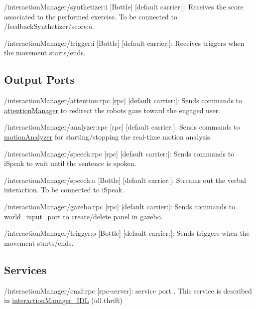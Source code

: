 \begin{DoxyItemize}
\item /interaction\+Manager/synthetizer\+:i \mbox{[}Bottle\mbox{]} \mbox{[}default carrier\+:\mbox{]}\+: Receives the score associated to the performed exercise. To be connected to /feedback\+Synthetizer/score\+:o.
\item /interaction\+Manager/trigger\+:i \mbox{[}Bottle\mbox{]} \mbox{[}default carrier\+:\mbox{]}\+: Receives triggers when the movement starts/ends.
\end{DoxyItemize}\hypertarget{group__skeletonViewer_outputports_sec}{}\subsection{Output Ports}\label{group__skeletonViewer_outputports_sec}

\begin{DoxyItemize}
\item /interaction\+Manager/attention\+:rpc \mbox{[}rpc\mbox{]} \mbox{[}default carrier\+:\mbox{]}\+: Sends commands to \mbox{\hyperlink{group__attentionManager}{attention\+Manager}} to redirect the robot\textquotesingle{}s gaze toward the engaged user.
\item /interaction\+Manager/analyzer\+:rpc \mbox{[}rpc\mbox{]} \mbox{[}default carrier\+:\mbox{]}\+: Sends commands to \mbox{\hyperlink{group__motionAnalyzer}{motion\+Analyzer}} for starting/stopping the real-\/time motion analysis.
\item /interaction\+Manager/speech\+:rpc \mbox{[}rpc\mbox{]} \mbox{[}default carrier\+:\mbox{]}\+: Sends commands to i\+Speak to wait until the sentence is spoken.
\item /interaction\+Manager/speech\+:o \mbox{[}Bottle\mbox{]} \mbox{[}default carrier\+:\mbox{]}\+: Streams out the verbal interaction. To be connected to i\+Speak.
\item /interaction\+Manager/gazebo\+:rpc \mbox{[}rpc\mbox{]} \mbox{[}default carrier\+:\mbox{]}\+: Sends commands to world\+\_\+input\+\_\+port to create/delete panel in gazebo.
\item /interaction\+Manager/trigger\+:o \mbox{[}Bottle\mbox{]} \mbox{[}default carrier\+:\mbox{]}\+: Sends triggers when the movement starts/ends.
\end{DoxyItemize}\hypertarget{group__skeletonViewer_services_sec}{}\subsection{Services}\label{group__skeletonViewer_services_sec}

\begin{DoxyItemize}
\item /interaction\+Manager/cmd\+:rpc \mbox{[}rpc-\/server\mbox{]}\+: service port . This service is described in \mbox{\hyperlink{classinteractionManager__IDL}{interaction\+Manager\+\_\+\+I\+DL}} (idl.\+thrift) 
\end{DoxyItemize}